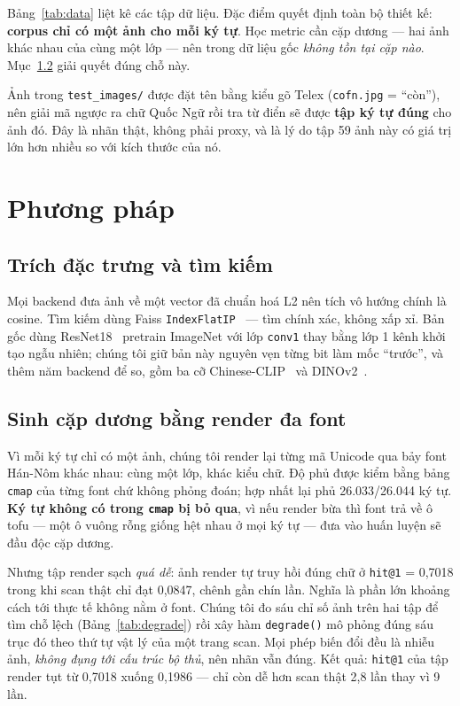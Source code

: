 \documentclass[conference,a4paper]{IEEEtran}
\newcommand{\code}[1]{{\small\texttt{#1}}}
\begin{document}
Bảng~\ref{tab:data} liệt kê các tập dữ liệu. Đặc điểm quyết định toàn bộ thiết kế:
\textbf{corpus chỉ có một ảnh cho mỗi ký tự}. Học metric cần
cặp dương --- hai ảnh khác nhau của cùng một lớp --- nên trong dữ liệu gốc \emph{không tồn tại cặp
nào}. Mục~\ref{sec:render} giải quyết đúng chỗ này.

Ảnh trong \code{test\_images/} được đặt tên bằng kiểu gõ Telex (\code{cofn.jpg} = ``còn''), nên giải
mã ngược ra chữ Quốc Ngữ rồi tra từ điển sẽ được \textbf{tập ký tự đúng} cho ảnh đó. Đây là nhãn
thật, không phải proxy, và là lý do tập 59 ảnh này có giá trị lớn hơn nhiều so với kích thước của nó.

\section{Phương pháp}

\subsection{Trích đặc trưng và tìm kiếm}

Mọi backend đưa ảnh về một vector đã chuẩn hoá L2 nên tích vô hướng chính là cosine. Tìm kiếm dùng
Faiss \code{IndexFlatIP}~\cite{faiss} --- tìm chính xác, không xấp xỉ. Bản gốc dùng ResNet18~\cite{resnet}
pretrain ImageNet với lớp \code{conv1} thay bằng lớp 1 kênh khởi tạo ngẫu nhiên; chúng tôi giữ bản
này nguyên vẹn từng bit làm mốc ``trước'', và thêm năm backend để so, gồm ba cỡ
Chinese-CLIP~\cite{chineseclip} và DINOv2~\cite{dinov2}.

\subsection{Sinh cặp dương bằng render đa font}
\label{sec:render}

Vì mỗi ký tự chỉ có một ảnh, chúng tôi render lại từng mã Unicode qua bảy font Hán-Nôm khác nhau:
cùng một lớp, khác kiểu chữ. Độ phủ được kiểm bằng bảng \code{cmap} của từng font chứ không phỏng
đoán; hợp nhất lại phủ 26.033/26.044 ký tự. \textbf{Ký tự không có trong \code{cmap} bị bỏ qua},
vì nếu render bừa thì font trả về ô tofu --- một ô vuông rỗng giống hệt nhau ở mọi ký tự --- đưa vào
huấn luyện sẽ đầu độc cặp dương.

Nhưng tập render sạch \emph{quá dễ}: ảnh render tự truy hồi đúng chữ ở \code{hit@1} = 0,7018 trong
khi scan thật chỉ đạt 0,0847, chênh gần chín lần. Nghĩa là phần lớn khoảng cách tới thực tế không
nằm ở font. Chúng tôi đo sáu chỉ số ảnh trên hai tập để tìm chỗ lệch (Bảng~\ref{tab:degrade}) rồi
xây hàm \code{degrade()} mô phỏng đúng sáu trục đó theo thứ tự vật lý của một trang scan. Mọi phép
biến đổi đều là nhiễu ảnh, \emph{không đụng tới cấu trúc bộ thủ}, nên nhãn vẫn đúng. Kết quả:
\code{hit@1} của tập render tụt từ 0,7018 xuống 0,1986 --- chỉ còn dễ hơn scan thật 2,8 lần thay vì
9 lần.
\end{document}
